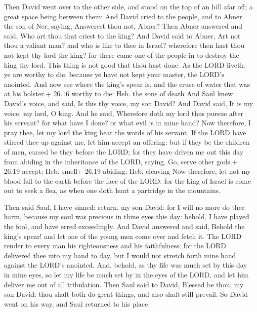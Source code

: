  Then David went over to the other side, and stood on the
top of an hill afar off; a great space being between them: 
And David cried to the people, and to Abner the son of Ner, saying,
Answerest thou not, Abner? Then Abner answered and said, Who art thou
that criest to the king?  And David said to Abner, Art not
thou a valiant man? and who is like to thee in Israel? wherefore then
hast thou not kept thy lord the king? for there came one of the people
in to destroy the king thy lord.  This thing is not good
that thou hast done. As the LORD liveth, ye are worthy to die, because
ye have not kept your master, the LORD's anointed. And now see where the
king's spear is, and the cruse of water that was at his bolster.+ 26.16
worthy to die: Heb. the sons of death  And Saul knew
David's voice, and said, Is this thy voice, my son David? And David
said, It is my voice, my lord, O king.  And he said,
Wherefore doth my lord thus pursue after his servant? for what have I
done? or what evil is in mine hand?  Now therefore, I pray
thee, let my lord the king hear the words of his servant. If the LORD
have stirred thee up against me, let him accept an offering: but if they
be the children of men, cursed be they before the LORD; for they have
driven me out this day from abiding in the inheritance of the LORD,
saying, Go, serve other gods.+ 26.19 accept: Heb. smell+ 26.19 abiding:
Heb. cleaving  Now therefore, let not my blood fall to the
earth before the face of the LORD: for the king of Israel is come out to
seek a flea, as when one doth hunt a partridge in the mountains.

 Then said Saul, I have sinned: return, my son David: for
I will no more do thee harm, because my soul was precious in thine eyes
this day: behold, I have played the fool, and have erred exceedingly.
 And David answered and said, Behold the king's spear! and
let one of the young men come over and fetch it.  The LORD
render to every man his righteousness and his faithfulness: for the LORD
delivered thee into my hand to day, but I would not stretch forth mine
hand against the LORD's anointed.  And, behold, as thy life
was much set by this day in mine eyes, so let my life be much set by in
the eyes of the LORD, and let him deliver me out of all tribulation.
 Then Saul said to David, Blessed be thou, my son David:
thou shalt both do great things, and also shalt still prevail. So David
went on his way, and Saul returned to his place.

